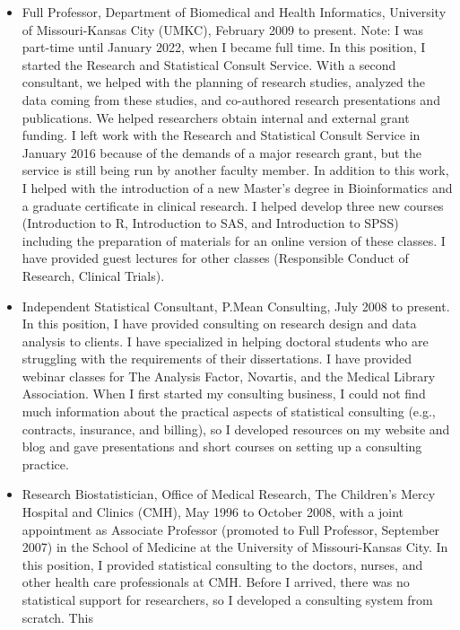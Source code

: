 \documentclass[
  12pt,
]{article}
\begin{document}
\begin{itemize}
\item
  Full Professor, Department of Biomedical and Health Informatics,
  University of Missouri-Kansas City (UMKC), February 2009 to present.
  Note: I was part-time until January 2022, when I became full time. In
  this position, I started the Research and Statistical Consult Service.
  With a second consultant, we helped with the planning of research
  studies, analyzed the data coming from these studies, and co-authored
  research presentations and publications. We helped researchers obtain
  internal and external grant funding. I left work with the Research and
  Statistical Consult Service in January 2016 because of the demands of
  a major research grant, but the service is still being run by another
  faculty member. In addition to this work, I helped with the
  introduction of a new Master's degree in Bioinformatics and a graduate
  certificate in clinical research. I helped develop three new courses
  (Introduction to R, Introduction to SAS, and Introduction to SPSS)
  including the preparation of materials for an online version of these
  classes. I have provided guest lectures for other classes (Responsible
  Conduct of Research, Clinical Trials).
\item
  Independent Statistical Consultant, P.Mean Consulting, July 2008 to
  present. In this position, I have provided consulting on research
  design and data analysis to clients. I have specialized in helping
  doctoral students who are struggling with the requirements of their
  dissertations. I have provided webinar classes for The Analysis
  Factor, Novartis, and the Medical Library Association. When I first
  started my consulting business, I could not find much information
  about the practical aspects of statistical consulting (e.g.,
  contracts, insurance, and billing), so I developed resources on my
  website and blog and gave presentations and short courses on setting
  up a consulting practice.
\item
  Research Biostatistician, Office of Medical Research, The Children's
  Mercy Hospital and Clinics (CMH), May 1996 to October 2008, with a
  joint appointment as Associate Professor (promoted to Full Professor,
  September 2007) in the School of Medicine at the University of
  Missouri-Kansas City. In this position, I provided statistical
  consulting to the doctors, nurses, and other health care professionals
  at CMH. Before I arrived, there was no statistical support for
  researchers, so I developed a consulting system from scratch. This

\end{itemize}
\end{document}
